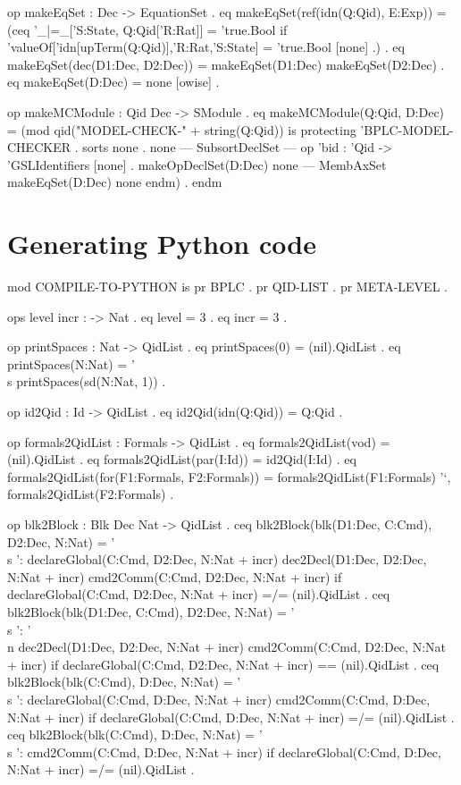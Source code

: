 \documentclass{llncs}%
\begin{document}
    op makeEqSet : Dec -> EquationSet .
    eq makeEqSet(ref(idn(Q:Qid), E:Exp)) = 
           (ceq '_|=_['S:State, Q:Qid['R:Rat]] = 'true.Bool 
            if 'valueOf['idn[upTerm(Q:Qid)],'R:Rat,'S:State] = 'true.Bool [none] .) .
    eq makeEqSet(dec(D1:Dec, D2:Dec)) = 
           makeEqSet(D1:Dec) makeEqSet(D2:Dec) .
    eq makeEqSet(D:Dec) = none [owise] .
    
    op makeMCModule : Qid Dec -> SModule .
    eq makeMCModule(Q:Qid, D:Dec) =
       (mod qid("MODEL-CHECK-" + string(Q:Qid)) is 
                        protecting 'BPLC-MODEL-CHECKER .
            sorts none .
            none --- SubsortDeclSet
            --- op 'bid : 'Qid -> 'GSLIdentifiers [none] .
            makeOpDeclSet(D:Dec)
            none --- MembAxSet
            makeEqSet(D:Dec)
            none endm) .
endm
\nwendcode{}\nwdocspar

\section{Generating Python code}

\nwenddocs{}\endmoddef\nwstartdeflinemarkup\nwenddeflinemarkup
mod COMPILE-TO-PYTHON is
    pr BPLC .
    pr QID-LIST .
    pr META-LEVEL .
    
    ops level incr : -> Nat .
    eq level = 3 .
    eq incr = 3 .

    op printSpaces : Nat -> QidList .
    eq printSpaces(0) = (nil).QidList .
    eq printSpaces(N:Nat) = '\\s printSpaces(sd(N:Nat, 1)) .
    
    op id2Qid : Id -> QidList .
    eq id2Qid(idn(Q:Qid)) = Q:Qid .
    
    op formals2QidList : Formals -> QidList .   
    eq formals2QidList(vod) = (nil).QidList .
    eq formals2QidList(par(I:Id)) = id2Qid(I:Id) .
    eq formals2QidList(for(F1:Formals, F2:Formals)) = 
       formals2QidList(F1:Formals) '`, formals2QidList(F2:Formals) .
       
    op blk2Block : Blk Dec Nat -> QidList .   
   ceq blk2Block(blk(D1:Dec, C:Cmd), D2:Dec, N:Nat) = 
       '\\s ':  
       declareGlobal(C:Cmd, D2:Dec, N:Nat + incr) 
       dec2Decl(D1:Dec, D2:Dec, N:Nat + incr) 
       cmd2Comm(C:Cmd, D2:Dec, N:Nat + incr) 
    if declareGlobal(C:Cmd, D2:Dec, N:Nat + incr) =/= (nil).QidList .
   ceq blk2Block(blk(D1:Dec, C:Cmd), D2:Dec, N:Nat) = 
        '\\s ': '\\n 
        dec2Decl(D1:Dec, D2:Dec, N:Nat + incr) 
        cmd2Comm(C:Cmd, D2:Dec, N:Nat + incr) 
    if declareGlobal(C:Cmd, D2:Dec, N:Nat + incr) == (nil).QidList .
   ceq blk2Block(blk(C:Cmd), D:Dec, N:Nat) = 
       '\\s ':  
       declareGlobal(C:Cmd, D:Dec, N:Nat + incr)
       cmd2Comm(C:Cmd, D:Dec, N:Nat + incr) 
    if declareGlobal(C:Cmd, D:Dec, N:Nat + incr) =/= (nil).QidList .   
   ceq blk2Block(blk(C:Cmd), D:Dec, N:Nat) = 
        '\\s ':   
        cmd2Comm(C:Cmd, D:Dec, N:Nat + incr) 
    if declareGlobal(C:Cmd, D:Dec, N:Nat + incr) =/= (nil).QidList .   
    
\end{document}
